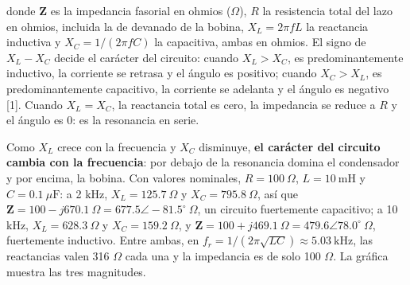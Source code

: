 \documentclass[11pt,letterpaper]{article}
\begin{document}
donde $\mathbf{Z}$ es la impedancia fasorial en ohmios (\ensuremath{\Omega}), $R$ la resistencia total del lazo en ohmios, incluida la de devanado de la bobina, $X_L = 2\pi f L$ la reactancia inductiva y $X_C = 1/(2\pi f C)$ la capacitiva, ambas en ohmios. El signo de $X_L - X_C$ decide el carácter del circuito: cuando $X_L > X_C$, es predominantemente inductivo, la corriente se retrasa y el ángulo es positivo; cuando $X_C > X_L$, es predominantemente capacitivo, la corriente se adelanta y el ángulo es negativo [1]. Cuando $X_L = X_C$, la reactancia total es cero, la impedancia se reduce a $R$ y el ángulo es 0\textdegree{}: es la resonancia en serie.

Como $X_L$ crece con la frecuencia y $X_C$ disminuye, \textbf{el carácter del circuito cambia con la frecuencia}: por debajo de la resonancia domina el condensador y por encima, la bobina. Con valores nominales, $R = 100\ \Omega$, $L = 10\ \text{mH}$ y $C = 0.1\ \mu\text{F}$: a 2 kHz, $X_L = 125.7\ \Omega$ y $X_C = 795.8\ \Omega$, así que $\mathbf{Z} = 100 - j670.1\ \Omega = 677.5 \angle -81.5^\circ\ \Omega$, un circuito fuertemente capacitivo; a 10 kHz, $X_L = 628.3\ \Omega$ y $X_C = 159.2\ \Omega$, y $\mathbf{Z} = 100 + j469.1\ \Omega = 479.6 \angle 78.0^\circ\ \Omega$, fuertemente inductivo. Entre ambas, en $f_r = 1/(2\pi\sqrt{LC}) \approx 5.03\ \text{kHz}$, las reactancias valen 316 \ensuremath{\Omega} cada una y la impedancia es de solo 100 \ensuremath{\Omega}. La gráfica muestra las tres magnitudes.
\end{document}
